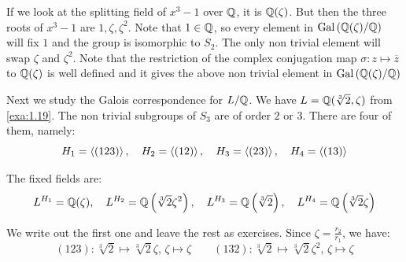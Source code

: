 \documentclass[twoside = false,	%
		headsepline,		%
		parskip = true,
		]{scrbook}						%
\begin{document}
        
        If we look at the splitting field of $x^3 - 1$ over $\mathbb Q$, it is $\mathbb Q(\zeta)$. But then the three roots of $x^3 - 1$ are $1, \zeta,\zeta^2$. Note that $1 \in \mathbb Q$, so every element in $\mathrm{Gal}\left( \mathbb Q(\zeta)/\mathbb Q\right)$ will fix $1$ and the group is isomorphic to $S_2$. The only non trivial element will swap $\zeta$ and $\zeta^2$. Note that the restriction of the complex conjugation map $\sigma:z \mapsto \overline{z}$ to $\mathbb Q(\zeta)$ is well defined and it gives the above non trivial element in $\mathrm{Gal}\left( \mathbb Q(\zeta)/\mathbb Q\right)$
        
        
        \begin{center}
        \end{center}
        Next we study the Galois correspondence for $L/\mathbb Q$. We have $L = \mathbb Q(\sqrt[3]{2},\zeta)$ from \ref{exa:1.19}. The non trivial subgroups of $S_3$ are of order $2$ or $3$. There are four of them, namely:
        \begin{equation*}
            H_1 = \left\langle (123)\right\rangle, \quad H_2 = \left\langle (12)\right\rangle, \quad H_3 = \left\langle (23)\right\rangle, \quad H_4 = \left\langle (13)\right\rangle
        \end{equation*}
        
        The fixed fields are:
        \begin{equation*}
            L^{H_1} = \mathbb Q(\zeta), \quad L^{H_2} = \mathbb Q\left( \sqrt[3]{2} \zeta^2\right), \quad L^{H_3} = \mathbb Q\left( \sqrt[3]{2}\right), \quad L^{H_4} = \mathbb Q\left( \sqrt[3]{2}\zeta\right)
        \end{equation*}
        
        We write out the first one and leave the rest as exercises. Since $\zeta = \frac{r_2}{r_1}$, we have:
	    \begin{equation*}
			(123): \sqrt[3]{2} \mapsto \sqrt[3]{2}\zeta, \, \zeta \mapsto \zeta \qquad (132): \sqrt[3]{2} \mapsto \sqrt[3]{2} \zeta^2, \, \zeta \mapsto \zeta
    	\end{equation*}
    	
\end{document}
